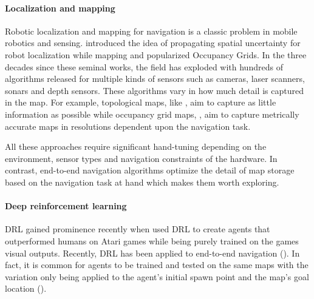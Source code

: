 \paragraph{Localization and mapping}
Robotic localization and mapping for navigation is a classic problem in  mobile robotics and sensing.
\cite{SmChIJRR1986} introduced the idea of propagating spatial uncertainty for robot localization while mapping and \cite{ElCOMPUTER1980} popularized Occupancy Grids.
In the three decades since these seminal works, the field has exploded with hundreds of algorithms released for multiple kinds of sensors such as cameras, laser scanners, sonars and depth sensors.
These algorithms vary in how much detail is captured in the map. For example, topological maps, like \cite{KuCOGSCI1978}, aim to capture as little information as possible while occupancy grid maps, \cite{ElCOMPUTER1980}, aim to capture metrically accurate maps in resolutions dependent upon the navigation task.

All these approaches require significant hand-tuning depending on the environment, sensor types and navigation constraints of the hardware.
In contrast, end-to-end navigation algorithms optimize the detail of map storage based on the navigation task at hand which makes them worth exploring.

\paragraph{Deep reinforcement learning}
DRL gained prominence recently when \cite{MnKaSiNIPSDLW2013,MnKaSiNATURE2015} used DRL to create agents that outperformed humans on Atari games while being purely trained on the games visual outputs.
Recently, DRL has been applied to end-to-end navigation (\cite{OhChSiICML2016,MiPaViICLR2017,ChLaSaNIPS2016}).
In fact, it is common for agents to be trained and tested on the same maps with the variation only being applied to the agent's initial spawn point and the map's goal location (\cite{MiPaViICLR2017,ZhMoKoICRA2017,KuSaGaAPA2016}). 


